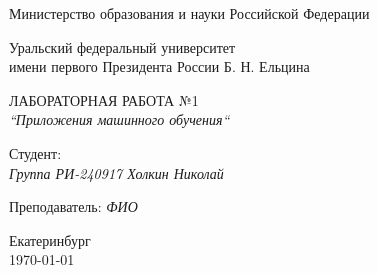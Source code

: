 \thispagestyle{empty}

\begin{center}
	Министерство образования и науки Российской Федерации
	
	\vspace{20pt}
	
	Уральский федеральный университет \\
	имени первого Президента России Б. Н. Ельцина
	
	\vspace{20pt}

\end{center}

\vfill

\begin{center}
	ЛАБОРАТОРНАЯ РАБОТА №1 \\
	\textit{``Приложения машинного обучения``}
	
	\vspace{20pt}
\end{center}

\vfill

	\noindent Студент: \\
	\textit{Группа РИ-240917 \hfill Холкин Николай}
	
	\vspace{5pt}
	
	\noindent Преподаватель: 
	\textit{\hfill ФИО}
	
	\vspace{20pt}

\vfill

\begin{center}
	Екатеринбург \\ \today
\end{center}

\newpage